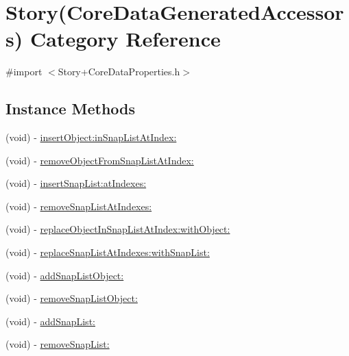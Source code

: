 \hypertarget{category_story_07_core_data_generated_accessors_08}{}\section{Story(Core\+Data\+Generated\+Accessors) Category Reference}
\label{category_story_07_core_data_generated_accessors_08}


{\ttfamily \#import $<$Story+\+Core\+Data\+Properties.\+h$>$}

\subsection*{Instance Methods}
\begin{DoxyCompactItemize}
\item 
(void) -\/ \hyperlink{category_story_07_core_data_generated_accessors_08_ac7aaa8d738a55d8f7cb8fd0c26fd4b70}{insert\+Object\+:in\+Snap\+List\+At\+Index\+:}
\item 
(void) -\/ \hyperlink{category_story_07_core_data_generated_accessors_08_a2862a1453b5d1ec4410421feed5acfdd}{remove\+Object\+From\+Snap\+List\+At\+Index\+:}
\item 
(void) -\/ \hyperlink{category_story_07_core_data_generated_accessors_08_a84a4bc73fd231a323da10244fa876157}{insert\+Snap\+List\+:at\+Indexes\+:}
\item 
(void) -\/ \hyperlink{category_story_07_core_data_generated_accessors_08_a9c8c74f019b3ea3a94588064ea5fd7b6}{remove\+Snap\+List\+At\+Indexes\+:}
\item 
(void) -\/ \hyperlink{category_story_07_core_data_generated_accessors_08_a8e0f8bc62ff304aedad4d3cc99e9398d}{replace\+Object\+In\+Snap\+List\+At\+Index\+:with\+Object\+:}
\item 
(void) -\/ \hyperlink{category_story_07_core_data_generated_accessors_08_a4cbef9206e2e91b3fdadd1fd93a722d1}{replace\+Snap\+List\+At\+Indexes\+:with\+Snap\+List\+:}
\item 
(void) -\/ \hyperlink{category_story_07_core_data_generated_accessors_08_a34b377739386181624777fb994e5b02e}{add\+Snap\+List\+Object\+:}
\item 
(void) -\/ \hyperlink{category_story_07_core_data_generated_accessors_08_af05da85ccc12e572393216b85f297ce2}{remove\+Snap\+List\+Object\+:}
\item 
(void) -\/ \hyperlink{category_story_07_core_data_generated_accessors_08_a3464007fbbd05bb5bd748f811a83e103}{add\+Snap\+List\+:}
\item 
(void) -\/ \hyperlink{category_story_07_core_data_generated_accessors_08_a0d250a043b1896262bc08562ef7e889a}{remove\+Snap\+List\+:}
\end{DoxyCompactItemize}


